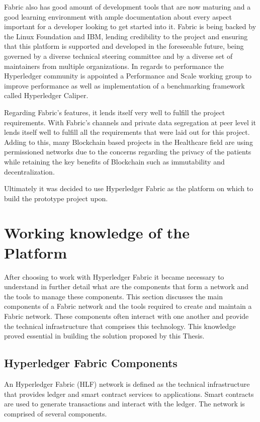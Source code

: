 Fabric also has good amount of development tools that are now maturing and a
good learning environment with ample documentation about every aspect important
for a developer looking to get started into it. Fabric is being backed by the
Linux Foundation and IBM, lending credibility to the project and ensuring that
this platform is supported and developed in the foreseeable future, being
governed by a diverse technical steering committee and by a diverse set of
maintainers from multiple organizations. In regards to performance the
Hyperledger community is appointed a Performance and Scale working group to
improve performance as well as implementation of a benchmarking framework
called Hyperledger Caliper.

Regarding Fabric's features, it lends itself very well to fulfill the project
requirements. With Fabric's channels and private data segregation at peer level
it lends itself well to fulfill all the requirements that were laid out for
this project. Adding to this, many Blockchain based projects in the Healthcare
field are using permissioned networks due to the concerns regarding the privacy
of the patients while retaining the key benefits of Blockchain such as
immutability and decentralization.

Ultimately it was decided to use Hyperledger Fabric as the platform on which to
build the prototype project upon.


\section{Working knowledge of the Platform}

After choosing to work with Hyperledger Fabric it became necessary to
understand in further detail what are the components that form a network and
the tools to manage these components. This section discusses the main
components of a Fabric network and the tools required to create and maintain a
Fabric network. These components often interact with one another and provide
the technical infrastructure that comprises this technology. This knowledge
proved essential in building the solution proposed by this Thesis.

\subsection{Hyperledger Fabric Components}

An Hyperledger Fabric (HLF) network is defined as the technical infrastructure
that provides ledger and smart contract services to applications. Smart
contracts are used to generate transactions and interact with the ledger. The
network is comprised of several components. 

